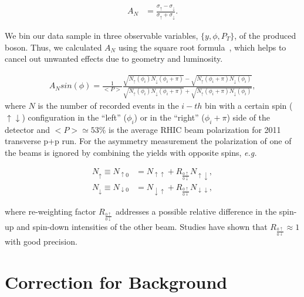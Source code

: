 \documentclass[12pt]{article}
\begin{document}
\begin{align}
\label{eq_anapower}
A_N &= \frac{\sigma_\uparrow - \sigma_\downarrow}{\sigma_\uparrow +
   \sigma_\downarrow}.
\end{align}

We bin our data sample in three observable variables, $\{y, \phi, P_T\}$, of the produced boson. Thus, 
we calculated $A_{N}$ using the square root formula~\cite{sqrtFormula}, which helps to cancel out unwanted effects due to geometry and luminosity.

\begin{align}
A_{N } sin(\phi)= \frac{1}{<P>}
\frac{\sqrt{N_\uparrow(\phi_i)N_\downarrow(\phi_i+\pi)} - \sqrt{N_\uparrow(\phi_i+\pi)N_\downarrow(\phi_i)} } 
{\sqrt{N_\uparrow(\phi_i)N_\downarrow(\phi_i+\pi)} + \sqrt{N_\uparrow(\phi_i+\pi)N_\downarrow(\phi_i)}},
\end{align}
where $N$ is the number of recorded events in the $i-th$ bin with a certain spin ($\uparrow \downarrow$) configuration in the ``left'' ($\phi_{i}$) or in the ``right'' ($\phi_{i} + \pi$) side of the detector and $<P>\simeq 53\%$ is the average RHIC beam polarization for 2011 transverse p+p run.  
For the asymmetry measurement the polarization of one of the beams is ignored by combining the
yields with opposite spins, \textit{e.g.}

\begin{align}
N_{\uparrow}   \equiv N_{\uparrow0}   &= N_{\uparrow\uparrow}   + R_{\frac{0\uparrow}{0\downarrow}} N_{\uparrow\downarrow},\\
N_{\downarrow} \equiv N_{\downarrow0} &= N_{\downarrow\uparrow} + R_{\frac{0\uparrow}{0\downarrow}} N_{\downarrow\downarrow},
\end{align}

\noindent
where re-weighting factor $R_{\frac{0\uparrow}{0\downarrow}}$ addresses a
possible relative difference in the spin-up and spin-down intensities of the
other beam. Studies have shown that $R_{\frac{0\uparrow}{0\downarrow}} \approx
1$ with good precision.



\section{Correction for Background}
\end{document}
